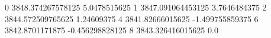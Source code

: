 0 3848.374267578125 5.0478515625
1 3847.091064453125 3.7646484375
2 3844.572509765625 1.24609375
4 3841.82666015625 -1.499755859375
6 3842.8701171875 -0.456298828125
8 3843.326416015625 0.0

